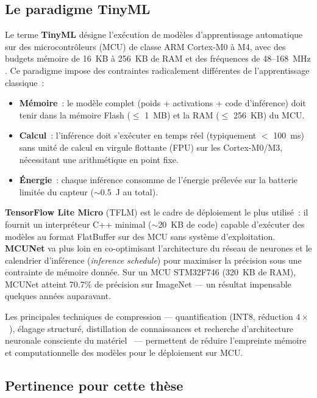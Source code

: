 \subsection{Le paradigme TinyML}

Le terme \textbf{TinyML} désigne l'exécution de modèles d'apprentissage automatique sur des microcontrôleurs (MCU) de classe ARM Cortex-M0 à M4, avec des budgets mémoire de 16~KB à 256~KB de RAM et des fréquences de 48--168~MHz \cite{Warden2020TinyML}. Ce paradigme impose des contraintes radicalement différentes de l'apprentissage classique~:

\begin{itemize}
    \item \textbf{Mémoire}~: le modèle complet (poids + activations + code d'inférence) doit tenir dans la mémoire Flash ($\leq$ 1~MB) et la RAM ($\leq$ 256~KB) du MCU.
    \item \textbf{Calcul}~: l'inférence doit s'exécuter en temps réel (typiquement $<$ 100~ms) sans unité de calcul en virgule flottante (FPU) sur les Cortex-M0/M3, nécessitant une arithmétique en point fixe.
    \item \textbf{Énergie}~: chaque inférence consomme de l'énergie prélevée sur la batterie limitée du capteur ($\sim$0.5~J au total).
\end{itemize}

\textbf{TensorFlow Lite Micro} (TFLM) \cite{david2021tensorflow} est le cadre de déploiement le plus utilisé~: il fournit un interpréteur C++ minimal ($\sim$20~KB de code) capable d'exécuter des modèles au format FlatBuffer sur des MCU sans système d'exploitation. \textbf{MCUNet} \cite{Lin2020MCUNet} va plus loin en co-optimisant l'architecture du réseau de neurones et le calendrier d'inférence (\emph{inference schedule}) pour maximiser la précision sous une contrainte de mémoire donnée. Sur un MCU STM32F746 (320~KB de RAM), MCUNet atteint 70.7\% de précision sur ImageNet --- un résultat impensable quelques années auparavant.

Les principales techniques de compression --- quantification (INT8, réduction $4\times$~\cite{Bianchi2021QuantizedGNN}), élagage structuré, distillation de connaissances et recherche d'architecture neuronale consciente du matériel~\cite{Cai2020OFA, Lin2020MCUNet} --- permettent de réduire l'empreinte mémoire et computationnelle des modèles pour le déploiement sur MCU.

\subsection{Pertinence pour cette thèse}


